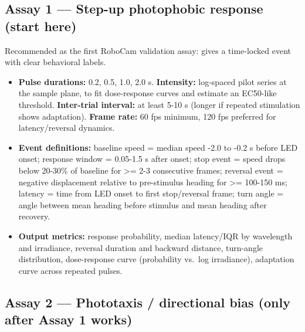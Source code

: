 \documentclass[
]{article}
\providecommand{\tightlist}{%
  \setlength{\itemsep}{0pt}\setlength{\parskip}{0pt}}
\begin{document}
\hypertarget{assay-1-step-up-photophobic-response-start-here}{%
\subsection{Assay 1 --- Step-up photophobic response (start
here)}\label{assay-1-step-up-photophobic-response-start-here}}

Recommended as the first RoboCam validation assay: gives a time-locked
event with clear behavioral labels.

\begin{itemize}
\tightlist
\item
  \textbf{Pulse durations:} 0.2, 0.5, 1.0, 2.0 s. \textbf{Intensity:}
  log-spaced pilot series at the sample plane, to fit dose-response
  curves and estimate an EC50-like threshold. \textbf{Inter-trial
  interval:} at least 5-10 s (longer if repeated stimulation shows
  adaptation). \textbf{Frame rate:} 60 fps minimum, 120 fps preferred
  for latency/reversal dynamics.
\item
  \textbf{Event definitions:} baseline speed = median speed -2.0 to -0.2
  s before LED onset; response window = 0.05-1.5 s after onset; stop
  event = speed drops below 20-30\% of baseline for \textgreater= 2-3
  consecutive frames; reversal event = negative displacement relative to
  pre-stimulus heading for \textgreater= 100-150 ms; latency = time from
  LED onset to first stop/reversal frame; turn angle = angle between
  mean heading before stimulus and mean heading after recovery.
\item
  \textbf{Output metrics:} response probability, median latency/IQR by
  wavelength and irradiance, reversal duration and backward distance,
  turn-angle distribution, dose-response curve (probability vs.~log
  irradiance), adaptation curve across repeated pulses.
\end{itemize}

\hypertarget{assay-2-phototaxis-directional-bias-only-after-assay-1-works}{%
\subsection{Assay 2 --- Phototaxis / directional bias (only after Assay
1
works)}\label{assay-2-phototaxis-directional-bias-only-after-assay-1-works}}
\end{document}
